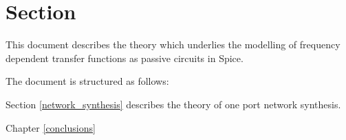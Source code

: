 \section{Section}\label{introduction}


This document describes the theory which underlies the modelling of frequency dependent transfer functions as passive circuits in Spice.

The document is structured as follows:

Section \ref{network_synthesis} describes the theory of one port network synthesis.

Chapter \ref{conclusions} 

